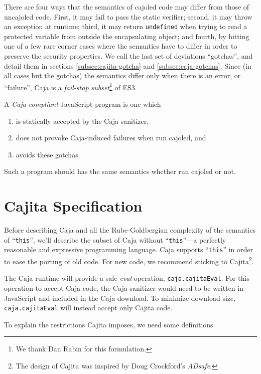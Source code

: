 \documentclass[letterpaper,twocolumn,10pt]{article}
\newcommand{\code}[1]{{\tt {#1}}}              %
\begin{document}
There are four ways that the semantics of cajoled code may differ from those of uncajoled code.
First, it may fail to pass the static verifier; second, it may throw an exception at runtime; third, it
may return \code{undefined} when trying to read a protected variable from outside the encapsulating
object; and fourth, by hitting one of a few rare corner cases where the semantics have to differ in order
to preserve the security properties.  We call the last set of deviations ``gotchas'', and detail them
in sections \ref{subsec:cajita-gotcha} and \ref{subsec:caja-gotchas}.  Since (in all cases but the gotchas) 
the semantics differ only when there is an error, or ``failure'', Caja is a \emph{fail-stop subset}\footnote{
%
We thank Dan Rabin for this formulation.
%
} of ES3.

A \emph{Caja-compliant} JavaScript program is one which
\begin{enumerate}
  \item is statically accepted by the Caja sanitizer,
  \item does not provoke Caja-induced failures when run cajoled, and
  \item avoids these gotchas.
\end{enumerate}
Such a program should has the same semantics whether run cajoled or not.


\section{Cajita Specification}
\label{sec:cajita-spec}
Before describing Caja and all the Rube-Goldbergian complexity of the
semantics of ``\code{this}'', we'll describe the subset of Caja without 
``\code{this}''---a perfectly reasonable and expressive programming 
language. Caja supports ``\code{this}'' in order to ease the porting of old 
code. For new code, we recommend sticking to Cajita\footnote{
%
The design of Cajita was inspired by Doug Crockford's \emph{ADsafe}.
%
}.

The Caja runtime will provide a safe \emph{eval} operation, \code{caja.cajitaEval}. For 
this operation to accept Caja code, the Caja sanitizer would need to be 
written in JavaScript and included in the Caja download. To minimize download 
size, \code{caja.cajitaEval} will instead accept only Cajita code.

To explain the restrictions Cajita imposes, we need some definitions.
\end{document}
